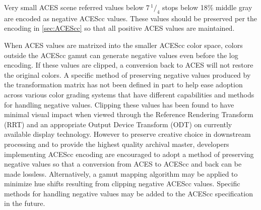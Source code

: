 \label{appendixA}

Very small ACES scene referred values below $7\,^1/_4$ stops below 18\% middle gray are encoded as negative ACEScc values. These values should be preserved per the encoding in \autoref{sec:ACEScc} so that all positive ACES values are maintained.

When ACES values are matrixed into the smaller ACEScc color space, colors outside the ACEScc gamut can generate negative values even before the log encoding. If these values are clipped, a conversion back to ACES will not restore the original colors. A specific method of preserving negative values produced by the transformation matrix has not been defined in part to help ease adoption across various color grading systems that have different capabilities and methods for handling negative values. Clipping these values has been found to have minimal visual impact when viewed through the Reference Rendering Transform (RRT) and an appropriate Output Device Transform (ODT) on currently available display technology. However to preserve creative choice in downstream processing and to provide the highest quality archival master, developers implementing ACEScc encoding are encouraged to adopt a method of preserving negative values so that a conversion from ACES to ACEScc and back can be made lossless. Alternatively, a gamut mapping algorithm may be applied to minimize hue shifts resulting from clipping negative ACEScc values. Specific methods for handling negative values may be added to the ACEScc specification in the future.